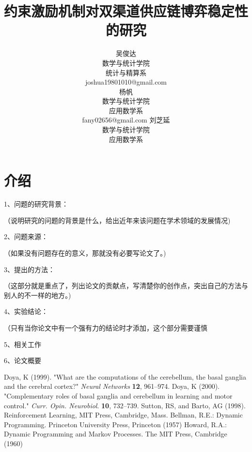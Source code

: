 \documentclass{article}
\title{约束激励机制对双渠道供应链博弈稳定性的研究}
\author{
    吴俊达\\数学与统计学院\\统计与精算系\\joshua19801010@gmail.com\\
    \And
    杨帆\\数学与统计学院\\应用数学系\\fany02656@gmail.com
    \And
    刘芝延\\数学与统计学院\\应用数学系\\
}
\begin{document}
\maketitle
\begin{abstract}
\end{abstract}
\keywords{}
\section{介绍}
\par1、问题的研究背景：
\par（说明研究的问题的背景是什么，给出近年来该问题在学术领域的发展情况)
\par2、问题来源：
\par（如果没有问题存在的意义，那就没有必要写论文了。)
\par3、提出的方法：
\par（这部分就是重点了，列出论文的贡献点，写清楚你的创作点，突出自己的方法与别人的不一样的地方。)
\par4、实验结论：
\par（只有当你论文中有一个强有力的结论时才添加，这个部分需要谨慎
\par5、相关工作
\par6、论文概要

\begin{thebibliography}{1}
 Doya, K (1999). "What are the computations of the cerebellum, the basal ganglia and the cerebral cortex?" \emph{Neural Networks} \textbf{12}, 961–974.
 Doya, K (2000). "Complementary roles of basal ganglia and cerebellum in learning and motor control." \emph{Curr. Opin. Neurobiol}. \textbf{10}, 732–739.
 Sutton, RS, and Barto, AG (1998). Reinforcement Learning, MIT Press, Cambridge, Mass.
 Bellman, R.E.: Dynamic Programming. Princeton University Press, Princeton (1957)
 Howard, R.A.: Dynamic Programming and Markov Processes. The MIT Press, Cambridge (1960)
\end{thebibliography}
\end{document}
